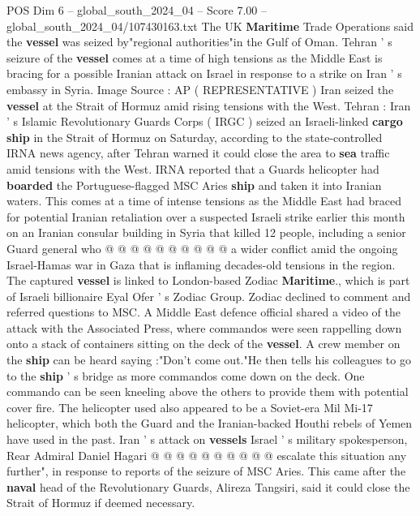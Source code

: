 \begin{textsample}{POS Dim 6 – global\_south\_2024\_04 – Score 7.00 – global\_south\_2024\_04/107430163.txt}  \label{ex:f6_pos_088}
The UK \textbf{Maritime} Trade Operations said the \textbf{vessel} was seized by"regional authorities"in the Gulf of Oman.
Tehran ' s seizure of the \textbf{vessel} comes at a time of high tensions as the Middle East is bracing for a possible Iranian attack on Israel in response to a strike on Iran ' s embassy in Syria.
Image Source : AP ( REPRESENTATIVE ) Iran seized the \textbf{vessel} at the Strait of Hormuz amid rising tensions with the West.
Tehran : Iran ' s Islamic Revolutionary Guards Corps ( IRGC ) seized an Israeli-linked \textbf{cargo} \textbf{ship} in the Strait of Hormuz on Saturday, according to the state-controlled IRNA news agency, after Tehran warned it could close the area to \textbf{sea} traffic amid tensions with the West.
IRNA reported that a Guards helicopter had \textbf{boarded} the Portuguese-flagged MSC Aries \textbf{ship} and taken it into Iranian waters.
This comes at a time of intense tensions as the Middle East had braced for potential Iranian retaliation over a suspected Israeli strike earlier this month on an Iranian consular building in Syria that killed 12 people, including a senior Guard general who @ @ @ @ @ @ @ @ @ @ a wider conflict amid the ongoing Israel-Hamas war in Gaza that is inflaming decades-old tensions in the region.
The captured \textbf{vessel} is linked to London-based Zodiac \textbf{Maritime}., which is part of Israeli billionaire Eyal Ofer ' s Zodiac Group.
Zodiac declined to comment and referred questions to MSC.
A Middle East defence official shared a video of the attack with the Associated Press, where commandos were seen rappelling down onto a stack of containers sitting on the deck of the \textbf{vessel}.
A crew member on the \textbf{ship} can be heard saying :"Don't come out."He then tells his colleagues to go to the \textbf{ship} ' s bridge as more commandos come down on the deck.
One commando can be seen kneeling above the others to provide them with potential cover fire.
The helicopter used also appeared to be a Soviet-era Mil Mi-17 helicopter, which both the Guard and the Iranian-backed Houthi rebels of Yemen have used in the past.
Iran ' s attack on \textbf{vessels} Israel ' s military spokesperson, Rear Admiral Daniel Hagari @ @ @ @ @ @ @ @ @ @ escalate this situation any further", in response to reports of the seizure of MSC Aries.
This came after the \textbf{naval} head of the Revolutionary Guards, Alireza Tangsiri, said it could close the Strait of Hormuz if deemed necessary.

\end{textsample}
